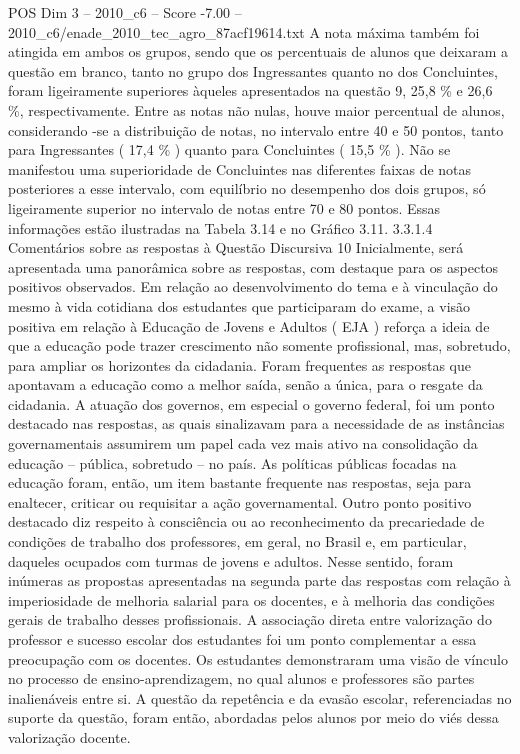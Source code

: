 \begin{textsample}{POS Dim 3 – 2010\_c6 – Score -7.00 – 2010\_c6/enade\_2010\_tec\_agro\_87acf19614.txt}
A nota máxima também foi atingida em ambos os grupos, sendo que os percentuais de alunos que deixaram a questão em branco, tanto no grupo dos Ingressantes quanto no dos Concluintes, foram ligeiramente superiores àqueles apresentados na questão 9, 25,8 \% e 26,6 \%, respectivamente.
Entre as notas não nulas, houve maior percentual de alunos, considerando -se a distribuição de notas, no intervalo entre 40 e 50 pontos, tanto para Ingressantes ( 17,4 \% ) quanto para Concluintes ( 15,5 \% ).
Não se manifestou uma superioridade de Concluintes nas diferentes faixas de notas posteriores a esse intervalo, com equilíbrio no desempenho dos dois grupos, só ligeiramente superior no intervalo de notas entre 70 e 80 pontos.
Essas informações estão ilustradas na Tabela 3.14 e no Gráfico 3.11. 3.3.1.4 Comentários sobre as respostas à Questão Discursiva 10 Inicialmente, será apresentada uma panorâmica sobre as respostas, com destaque para os aspectos positivos observados.
Em relação ao desenvolvimento do tema e à vinculação do mesmo à vida cotidiana dos estudantes que participaram do exame, a visão positiva em relação à Educação de Jovens e Adultos ( EJA ) reforça a ideia de que a educação pode trazer crescimento não somente profissional, mas, sobretudo, para ampliar os horizontes da cidadania.
Foram frequentes as respostas que apontavam a educação como a melhor saída, senão a única, para o resgate da cidadania.
A atuação dos governos, em especial o governo federal, foi um ponto destacado nas respostas, as quais sinalizavam para a necessidade de as instâncias governamentais assumirem um papel cada vez mais ativo na consolidação da educação – pública, sobretudo – no país.
As políticas públicas focadas na educação foram, então, um item bastante frequente nas respostas, seja para enaltecer, criticar ou requisitar a ação governamental.
Outro ponto positivo destacado diz respeito à consciência ou ao reconhecimento da precariedade de condições de trabalho dos professores, em geral, no Brasil e, em particular, daqueles ocupados com turmas de jovens e adultos.
Nesse sentido, foram inúmeras as propostas apresentadas na segunda parte das respostas com relação à imperiosidade de melhoria salarial para os docentes, e à melhoria das condições gerais de trabalho desses profissionais.
A associação direta entre valorização do professor e sucesso escolar dos estudantes foi um ponto complementar a essa preocupação com os docentes.
Os estudantes demonstraram uma visão de vínculo no processo de ensino-aprendizagem, no qual alunos e professores são partes inalienáveis entre si.
A questão da repetência e da evasão escolar, referenciadas no suporte da questão, foram então, abordadas pelos alunos por meio do viés dessa valorização docente.

\end{textsample}
